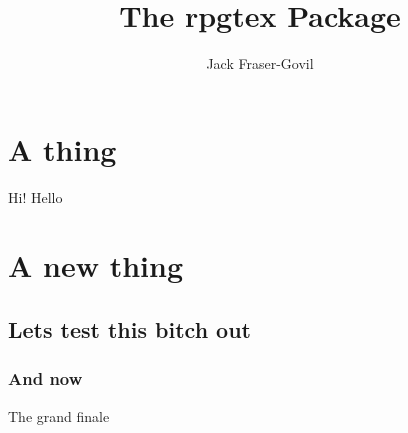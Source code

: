 \documentclass[11pt,theme=default]{rpgbook}
\title{The rpgtex Package}
\author{Jack Fraser-Govil}
\begin{document}
	\frontmatter
	\maketitle[typewriter]{}

	\tableofcontents
	\mainmatter

	\part[typewriter]{A thing}

		\begin{RpgSidebar}{Hi!}
			Hello
		\end{RpgSidebar}

	\part{A new thing}
		\chapter{Lets test this bitch out}

			\section{And now}

				The grand finale
\end{document}
